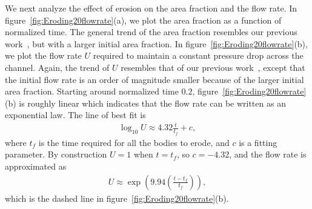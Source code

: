 \documentclass{jfm}
\begin{document}
We next analyze the effect of erosion on the area fraction and the flow
rate.  In figure~\ref{fig:Eroding20flowrate}(a), we plot the area
fraction as a function of normalized time.  The general trend of the
area fraction resembles our previous work~\citep[see][figure
10(a)]{qua-moo2018}, but with a larger initial area fraction.  In
figure~\ref{fig:Eroding20flowrate}(b), we plot the flow rate $U$
required to maintain a constant pressure drop across the channel.
Again, the trend of $U$ resembles that of our previous
work~\citep[see][figure 10(b)]{qua-moo2018}, except that the initial
flow rate is an order of magnitude smaller because of the larger initial
area fraction.  Starting around normalized time $0.2$,
figure~\ref{fig:Eroding20flowrate}(b) is roughly linear which indicates
that the flow rate can be written as an exponential law.  The line of
best fit is
\begin{align} 
  \log_{10} U \approx 4.32 \frac{t}{t_f} + c, 
\end{align}
where $t_f$ is the time required for all the bodies to erode, and $c$ is
a fitting parameter. By construction $U = 1$ when $t=t_f$, so $c=-4.32$,
and the flow rate is approximated as
\begin{align}
  U \approx \exp\left(9.94 \left(\frac{t - t_f}{t_f} \right)\right),
\end{align}
which is the dashed line in figure~\ref{fig:Eroding20flowrate}(b).
\end{document}

